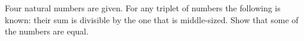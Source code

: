 \problem
Four natural numbers are given.
For any triplet of numbers the following is known: their sum is divisible by the one that is middle-sized.
Show that some of the numbers are equal.
\solution
\endproblem
